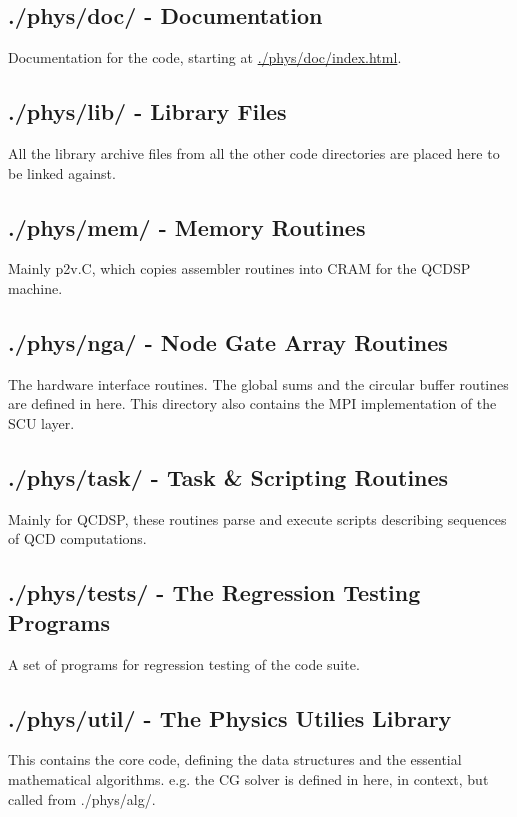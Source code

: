 \documentclass[12pt]{article}
\begin{document}
\subsection{./phys/doc/ - Documentation}
\label{phys:doc}
Documentation for the code, starting at
\href{../index.html}{./phys/doc/index.html}.

\subsection{./phys/lib/ - Library Files}
\label{phys:lib}
All the library archive files from all the other code directories are placed
here to be linked against.

\subsection{./phys/mem/ - Memory Routines}
\label{phys:mem}
Mainly p2v.C, which copies assembler routines into CRAM for the QCDSP machine.

\subsection{./phys/nga/ - Node Gate Array Routines}
\label{phys:nga}
The hardware interface routines.  The global sums and the circular buffer
routines are defined in here.  This directory also contains the MPI
implementation of the SCU layer.

\subsection{./phys/task/ - Task \& Scripting Routines}
\label{phys:task}
Mainly for QCDSP, these routines parse and execute scripts describing
sequences of QCD computations.

\subsection{./phys/tests/ - The Regression Testing Programs}
\label{phys:tests}
A set of programs for regression testing of the code suite.

\subsection{./phys/util/ - The Physics Utilies Library}
\label{phys:util}
This contains the core code, defining the data structures and the essential 
mathematical algorithms. e.g. the CG solver is defined in here, in context,
but called from ./phys/alg/.
\end{document}
